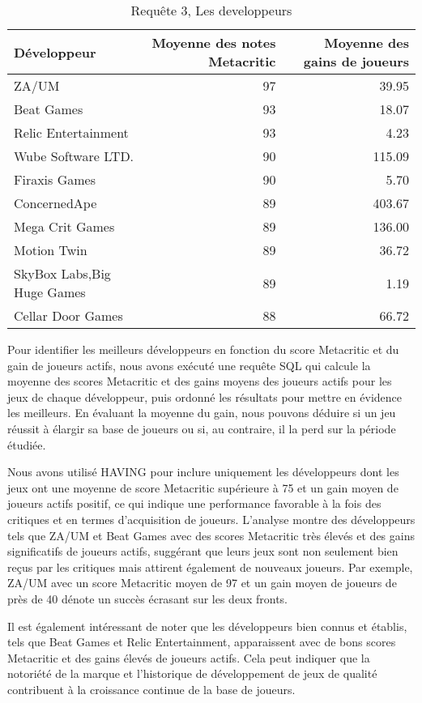 \documentclass[mstat,12pt]{unswthesis}
\begin{document}
\begin{longtable}[t]{>{\raggedright\arraybackslash}p{5cm}rr}
\caption{\label{tab:results-table developpeurs invisible}Requête 3, Les developpeurs}\\
\toprule
Développeur & Moyenne des notes Metacritic & Moyenne des gains de joueurs\\
\midrule
ZA/UM & 97 & 39.95\\
Beat Games & 93 & 18.07\\
Relic Entertainment & 93 & 4.23\\
Wube Software LTD. & 90 & 115.09\\
Firaxis Games & 90 & 5.70\\
\addlinespace
ConcernedApe & 89 & 403.67\\
Mega Crit Games & 89 & 136.00\\
Motion Twin & 89 & 36.72\\
SkyBox Labs,Big Huge Games & 89 & 1.19\\
Cellar Door Games & 88 & 66.72\\
\bottomrule
\end{longtable}
\endgroup{}

Pour identifier les meilleurs développeurs en fonction du score
Metacritic et du gain de joueurs actifs, nous avons exécuté une requête
SQL qui calcule la moyenne des scores Metacritic et des gains moyens des
joueurs actifs pour les jeux de chaque développeur, puis ordonné les
résultats pour mettre en évidence les meilleurs. En évaluant la moyenne
du gain, nous pouvons déduire si un jeu réussit à élargir sa base de
joueurs ou si, au contraire, il la perd sur la période étudiée.

Nous avons utilisé HAVING pour inclure uniquement les développeurs dont
les jeux ont une moyenne de score Metacritic supérieure à 75 et un gain
moyen de joueurs actifs positif, ce qui indique une performance
favorable à la fois des critiques et en termes d'acquisition de joueurs.
L'analyse montre des développeurs tels que ZA/UM et Beat Games avec des
scores Metacritic très élevés et des gains significatifs de joueurs
actifs, suggérant que leurs jeux sont non seulement bien reçus par les
critiques mais attirent également de nouveaux joueurs. Par exemple,
ZA/UM avec un score Metacritic moyen de 97 et un gain moyen de joueurs
de près de 40 dénote un succès écrasant sur les deux fronts.

Il est également intéressant de noter que les développeurs bien connus
et établis, tels que Beat Games et Relic Entertainment, apparaissent
avec de bons scores Metacritic et des gains élevés de joueurs actifs.
Cela peut indiquer que la notoriété de la marque et l'historique de
développement de jeux de qualité contribuent à la croissance continue de
la base de joueurs.
\end{document}
